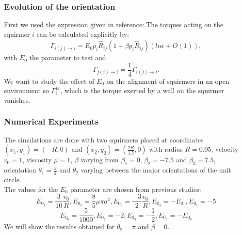 \documentclass{article}
\begin{document}
\subsubsection*{Evolution of the orientation}
First we used the expression given in reference:\cite{Lauga}.The torques acting on the squirmer $i$ can
 be calculated explicitly by:
$$
\Gamma_{i(j)\rightarrow i} = E_0p_i\hat{R}_{ij}^{\perp}(1 + \beta p_i\hat{R}_{ij})(ln \epsilon + O(1)),
$$
with $E_0$ the parameter to test and
$$
\Gamma_{j(i)\rightarrow i} = \frac{1}{4}\Gamma_{i(j)\rightarrow i}.
$$
We want to study the effect of $E_0$ on the alignment of squirmers in an open environment so $\Gamma_{i}^W$, which is the torque 
exerted by a wall on the squirmer vanishes.

\subsubsection*{Numerical Experiments}
The simulations are done with two squirmers placed at coordinates $(x_1, y_1) = (-R, 0)$ and $(x_2, y_2) = (\frac{2R}{1.5}, 0)$ with radius $R=0.05$, velocity $v_0=1$, viscosity $\mu = 1$, $\beta$ varying from $\beta_1 = 0$,
 $\beta_2 = -7.5$ and $\beta_3 = 7.5$, orientation $\theta_1 = \frac{\pi}{2}$ and $\theta_2$ varying between the major orientations of the unit circle.\\
 The values for the $E_0$ parameter are chosen from previous studies\cite{Brumley}\cite{Lauga}:
 $$
 E_{0_{1}} = \frac{3}{10}\frac{v_0}{R}, E_{0_{2}} = \frac{8}{5}\mu\pi a^2, E_{0_{3}} = \frac{-3}{2}\frac{v_0}{R},
 E_{0_{4}} = -E_{0_{1}}, E_{0_{5}} = -5$$
 $$
 E_{0_{6}} = \frac{5}{1000}, E_{0_{7}} = -2, E_{0_{8}} = -\frac{1}{2}, E_{0_{9}} = -E_{0_{8}}
 $$
We will show the results obtained for $\theta_2 = \pi$ and $\beta = 0$.
\end{document}

